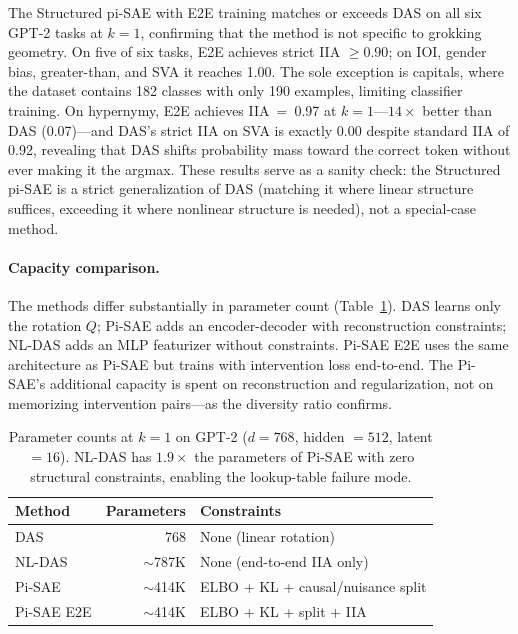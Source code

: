 \documentclass{article}
\begin{document}
The Structured pi-SAE with E2E training matches or exceeds DAS on all six
GPT-2 tasks at $k{=}1$, confirming that the method is not specific to
grokking geometry. On five of six tasks, E2E achieves strict IIA $\geq 0.90$;
on IOI, gender bias, greater-than, and SVA it reaches 1.00. The sole
exception is capitals, where the dataset contains 182 classes with only 190
examples, limiting classifier training. On hypernymy, E2E achieves
IIA~=~0.97 at $k{=}1$---$14\times$ better than DAS (0.07)---and DAS's strict
IIA on SVA is exactly 0.00 despite standard IIA of 0.92, revealing that DAS
shifts probability mass toward the correct token without ever making it the
argmax. These results serve as a sanity check: the Structured pi-SAE is a
strict generalization of DAS (matching it where linear structure suffices,
exceeding it where nonlinear structure is needed), not a special-case method.

\paragraph{Capacity comparison.}
The methods differ substantially in parameter count
(Table~\ref{tab:params}). DAS learns only the rotation $Q$; Pi-SAE adds
an encoder-decoder with reconstruction constraints; NL-DAS adds an MLP
featurizer without constraints. Pi-SAE E2E uses the same architecture
as Pi-SAE but trains with intervention loss end-to-end. The Pi-SAE's
additional capacity is spent on reconstruction and regularization, not
on memorizing intervention pairs---as the diversity ratio confirms.

\begin{table}[t]
\centering
\small
\begin{tabular}{lrl}
\toprule
Method & Parameters & Constraints \\
\midrule
DAS         & 768     & None (linear rotation) \\
NL-DAS      & $\sim$787K  & None (end-to-end IIA only) \\
Pi-SAE      & $\sim$414K  & ELBO + KL + causal/nuisance split \\
Pi-SAE E2E  & $\sim$414K  & ELBO + KL + split + IIA \\
\bottomrule
\end{tabular}
\caption{Parameter counts at $k{=}1$ on GPT-2 ($d = 768$, hidden $= 512$,
  latent $= 16$). NL-DAS has $1.9\times$ the parameters of Pi-SAE with
  zero structural constraints, enabling the lookup-table failure mode.}
\label{tab:params}
\end{table}
\end{document}
